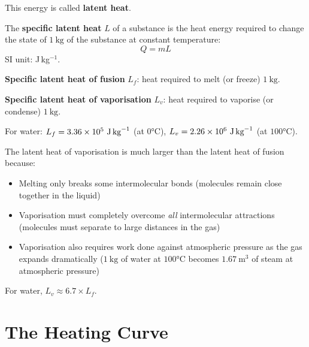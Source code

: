 This energy is called \textbf{latent heat}.

\begin{definitionbox}
The \textbf{specific latent heat} $L$ of a substance
is the heat energy required to change the state of
$1\ \text{kg}$ of the substance at constant
temperature:
\[
  Q = mL
\]
SI unit: J\,kg$^{-1}$.

\textbf{Specific latent heat of fusion} $L_f$:
heat required to melt (or freeze) $1\ \text{kg}$.

\textbf{Specific latent heat of vaporisation} $L_v$:
heat required to vaporise (or condense) $1\ \text{kg}$.

For water:
$L_f = 3.36\times10^5\ \text{J\,kg}^{-1}$
(at $0°\text{C}$),
$L_v = 2.26\times10^6\ \text{J\,kg}^{-1}$
(at $100°\text{C}$).
\end{definitionbox}

\begin{keybox}[Why $L_v \gg L_f$]
The latent heat of vaporisation is much larger than
the latent heat of fusion because:
\begin{itemize}[noitemsep]
  \item Melting only breaks some intermolecular bonds
  (molecules remain close together in the liquid)
  \item Vaporisation must completely overcome
  \textit{all} intermolecular attractions (molecules
  must separate to large distances in the gas)
  \item Vaporisation also requires work done against
  atmospheric pressure as the gas expands dramatically
  ($1\ \text{kg}$ of water at $100°\text{C}$
  becomes $1.67\ \text{m}^3$ of steam at atmospheric
  pressure)
\end{itemize}
For water, $L_v \approx 6.7 \times L_f$.
\end{keybox}

\section{The Heating Curve}

